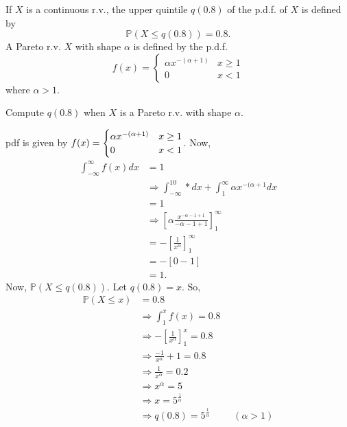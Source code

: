 \documentclass[letterpaper,12pt,addpoints]{exam}
\begin{document}
\begin{questions}
\vspace*{\fill}\eject






\question[15]
If $X$ is a continuous r.v., the upper quintile $q(0.8)$ of the p.d.f. of $X$ 
is defined by
\[
 \mathbb{P}(X\leq q(0.8))=0.8.
\]
A Pareto r.v. $X$ with shape $\alpha$ is defined by the p.d.f.
\[
 f(x)=\begin{cases}
 \alpha x^{-(\alpha+1)}& x\geq1\\
 0 & x<1
 \end{cases}
\]
where $\alpha>1$.

Compute $q(0.8)$ when $X$ is a Pareto r.v. with shape 
$\alpha$.


\begin{solution}
pdf is given by $f(x)=\begin{cases}
 \alpha x^{-(\alpha+1)}&x\geq1\crcr
 0&x<1
\end{cases}$.
 Now,
\begin{align*}
    \int_{-\infty}^{\infty}f(x)dx&=1\\
    &\Rightarrow \int_{-\infty}^10*dx+\int_1^{\infty}\alpha x^{-(\alpha+1}dx\\
    &=1\\
    &\Rightarrow [\alpha \frac{x^{-\alpha-1+1}}{-\alpha-1+1}]^{\infty}_1\\
    &=-[\frac{1}{x^{\alpha}}]^{\infty}_1\\
    &= -[0-1]\\
    &=1.
\end{align*} Now, $\mathbb{P}(X\leq q(0.8))$. Let $q(0.8)=x$. So,
\begin{align*}
    \mathbb{P}(X\leq x)&=0.8\\
    &\Rightarrow \int_1^xf(x) = 0.8\\
    &\Rightarrow -[\frac{1}{x^\alpha}]^x_1=0.8\\
    &\Rightarrow \frac{-1}{x^\alpha}+1=0.8\\
    &\Rightarrow \frac{1}{x^\alpha}=0.2\\
    &\Rightarrow x^\alpha = 5\\
    &\Rightarrow x=5^{\frac{1}{\alpha}}\\
    &\Rightarrow q(0.8)=5^{\frac{1}{\alpha}}  \hspace{1cm} (\alpha>1)
\end{align*}
\end{solution}



\end{questions}
\end{document}
